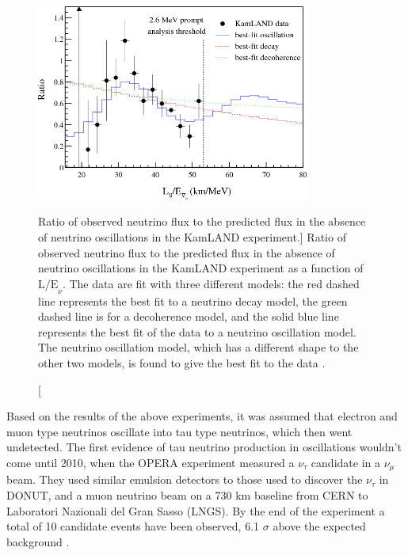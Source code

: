\begin{figure}

	\centering

	\includegraphics[width=0.8\textwidth]{figures/kamland_spec.png}

	\caption
	[Ratio of observed neutrino flux to the predicted flux in the absence of
	neutrino oscillations in the KamLAND experiment.]
	{Ratio of observed neutrino flux to the predicted flux in the absence of
	neutrino oscillations in the KamLAND experiment as a function of 
	\(\mbox{L/E}_\nu\). The data are fit with three different models: the red 
	dashed line represents the best fit to a neutrino decay model, the green 
	dashed line is for a decoherence model, and the solid blue line represents the 
	best fit of the data to a neutrino oscillation model. The neutrino oscillation
	model, which has a different shape to the other two models, is found to give 
	the best fit to the data \cite{Araki2005}.} 

	\label{fig:kamland_spectrum}

\end{figure}

Based on the results of the above experiments, it was assumed that electron and
muon type neutrinos oscillate into tau type neutrinos, which then
went undetected. The first evidence of tau neutrino production in oscillations
wouldn't come until 2010, when the OPERA experiment measured a \(\nu_\tau\) 
candidate in a \(\nu_\mu\) beam. They used similar emulsion detectors to those 
used to discover the \(\nu_\tau\) in DONUT, and a muon neutrino beam on a 730 km 
baseline from CERN to Laboratori Nazionali del Gran Sasso (LNGS). By the end 
of the experiment a total of 10 candidate events have been observed, 6.1 
\(\sigma\) above the expected background \cite{Agafonova2010, Agafonova2018}.


